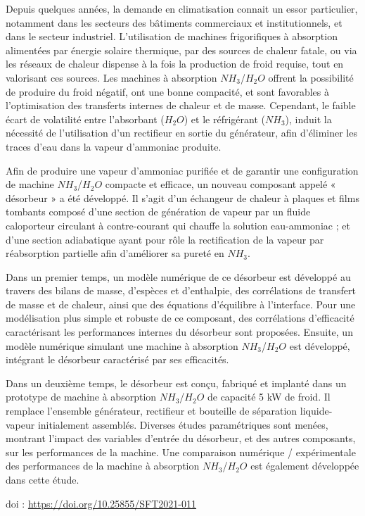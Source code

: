 {\normalsize
Depuis quelques années, la demande en climatisation connait un essor particulier, notamment dans les secteurs des bâtiments commerciaux et institutionnels, et dans le secteur industriel.  L'utilisation de machines frigorifiques à absorption alimentées par énergie solaire thermique, par des sources de chaleur fatale, ou via les réseaux de chaleur dispense à la fois la production de froid requise, tout en valorisant ces sources. Les machines à absorption $\unit{NH_3}$/$\unit{H_2O}$ offrent la possibilité de produire du froid négatif, ont une bonne compacité, et sont favorables à l'optimisation des transferts internes de chaleur et de masse. Cependant, le faible écart de volatilité entre l'absorbant ($\unit{H_2O}$) et le réfrigérant ($\unit{NH_3}$), induit la nécessité de l'utilisation d'un rectifieur en sortie du générateur, afin d'éliminer les traces d'eau dans la vapeur d'ammoniac produite. 







Afin de produire une vapeur d'ammoniac purifiée et de garantir une configuration de machine $\unit{NH_3}$/$\unit{H_2O}$ compacte et efficace, un nouveau composant appelé « désorbeur » a été développé.  Il s'agit d'un échangeur de chaleur à plaques et films tombants composé d'une section de génération de vapeur par un fluide caloporteur circulant à contre-courant qui chauffe la solution eau-ammoniac ; et d'une section adiabatique ayant pour rôle la rectification de la vapeur par réabsorption partielle afin d'améliorer sa pureté en $\unit{NH_3}$. 







Dans un premier temps, un modèle numérique de ce désorbeur est développé au travers des bilans de masse, d'espèces et d'enthalpie, des corrélations de transfert de masse et de chaleur, ainsi que des équations d'équilibre à l'interface. Pour une modélisation plus simple et robuste de ce composant, des corrélations d'efficacité caractérisant les performances internes du désorbeur sont proposées. Ensuite, un modèle numérique simulant une machine à absorption $\unit{NH_3}$/$\unit{H_2O}$ est développé, intégrant le désorbeur caractérisé par ses efficacités. 







Dans un deuxième temps, le désorbeur est conçu, fabriqué et implanté dans un prototype de machine à absorption $\unit{NH_3}$/$\unit{H_2O}$ de capacité 5 kW de froid. Il remplace l'ensemble générateur, rectifieur et bouteille de séparation liquide-vapeur initialement assemblés. Diverses études paramétriques sont menées, montrant l'impact des variables d'entrée du désorbeur, et des autres composants, sur les performances de la machine. Une comparaison numérique / expérimentale des performances de la machine à absorption $\unit{NH_3}$/$\unit{H_2O}$ est également développée dans cette étude.

 \vfill doi : \url{https://doi.org/10.25855/SFT2021-011}

}
 
